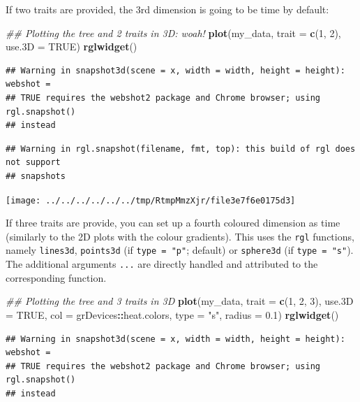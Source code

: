 \documentclass[
]{book}
\newenvironment{Shaded}{\begin{snugshade}}{\end{snugshade}}
\newcommand{\CommentTok}[1]{\textcolor[rgb]{0.56,0.35,0.01}{\textit{#1}}}
\newcommand{\DataTypeTok}[1]{\textcolor[rgb]{0.13,0.29,0.53}{#1}}
\newcommand{\DecValTok}[1]{\textcolor[rgb]{0.00,0.00,0.81}{#1}}
\newcommand{\FloatTok}[1]{\textcolor[rgb]{0.00,0.00,0.81}{#1}}
\newcommand{\KeywordTok}[1]{\textcolor[rgb]{0.13,0.29,0.53}{\textbf{#1}}}
\newcommand{\NormalTok}[1]{#1}
\newcommand{\OperatorTok}[1]{\textcolor[rgb]{0.81,0.36,0.00}{\textbf{#1}}}
\newcommand{\OtherTok}[1]{\textcolor[rgb]{0.56,0.35,0.01}{#1}}
\newcommand{\StringTok}[1]{\textcolor[rgb]{0.31,0.60,0.02}{#1}}
\begin{document}
If two traits are provided, the 3rd dimension is going to be time by default:

\begin{Shaded}
\begin{Highlighting}[]
\CommentTok{\#\# Plotting the tree and 2 traits in 3D: woah!}
\KeywordTok{plot}\NormalTok{(my\_data, }\DataTypeTok{trait =} \KeywordTok{c}\NormalTok{(}\DecValTok{1}\NormalTok{, }\DecValTok{2}\NormalTok{), }\DataTypeTok{use.3D =} \OtherTok{TRUE}\NormalTok{)}
\KeywordTok{rglwidget}\NormalTok{()}
\end{Highlighting}
\end{Shaded}

\begin{verbatim}
## Warning in snapshot3d(scene = x, width = width, height = height): webshot =
## TRUE requires the webshot2 package and Chrome browser; using rgl.snapshot()
## instead
\end{verbatim}

\begin{verbatim}
## Warning in rgl.snapshot(filename, fmt, top): this build of rgl does not support
## snapshots
\end{verbatim}

\texttt{[image: ../../../../../../tmp/RtmpMmzXjr/file3e7f6e0175d3]}

If three traits are provide, you can set up a fourth coloured dimension as time (similarly to the 2D plots with the colour gradients).
This uses the \texttt{rgl} functions, namely \texttt{lines3d}, \texttt{points3d} (if \texttt{type\ =\ "p"}; default) or \texttt{sphere3d} (if \texttt{type\ =\ "s"}).
The additional arguments \texttt{...} are directly handled and attributed to the corresponding function.

\begin{Shaded}
\begin{Highlighting}[]
\CommentTok{\#\# Plotting the tree and 3 traits in 3D}
\KeywordTok{plot}\NormalTok{(my\_data, }\DataTypeTok{trait =} \KeywordTok{c}\NormalTok{(}\DecValTok{1}\NormalTok{, }\DecValTok{2}\NormalTok{, }\DecValTok{3}\NormalTok{), }\DataTypeTok{use.3D =} \OtherTok{TRUE}\NormalTok{,}
     \DataTypeTok{col =}\NormalTok{ grDevices}\OperatorTok{::}\NormalTok{heat.colors, }\DataTypeTok{type =} \StringTok{"s"}\NormalTok{, }\DataTypeTok{radius =} \FloatTok{0.1}\NormalTok{)}
\KeywordTok{rglwidget}\NormalTok{()}
\end{Highlighting}
\end{Shaded}

\begin{verbatim}
## Warning in snapshot3d(scene = x, width = width, height = height): webshot =
## TRUE requires the webshot2 package and Chrome browser; using rgl.snapshot()
## instead
\end{verbatim}
\end{document}

